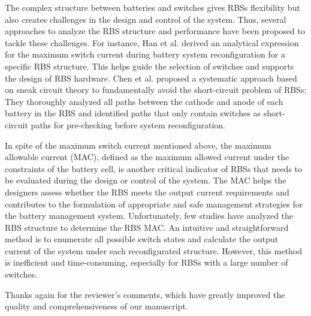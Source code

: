 \begin{revresponse}
\begin{changes}
The complex structure between batteries and switches gives RBSs flexibility but also creates challenges in the design and control of the system. 
Thus, several approaches to analyze the RBS structure and performance have been proposed to tackle these challenges.
For instance, 
Han et al. \cite{han2021analysis} derived an analytical expression for the maximum switch current during battery system reconfiguration for a specific RBS structure. 
This helps guide the selection of switches and supports the design of RBS hardware.
Chen et al. \cite{chenSneakCircuitTheory2021} proposed a systematic approach based on  sneak circuit theory to fundamentally avoid the short-circuit problem of RBSs: 
They thoroughly analyzed all paths between the cathode and anode of each battery in the RBS and identified paths that only contain switches as short-circuit paths for pre-checking before system reconfiguration. 


In spite of the maximum switch current mentioned above, the maximum allowable current (MAC), defined as the maximum allowed current  under the constraints of the battery cell, is another critical indicator of RBSs that needs to be evaluated during the design or control  of the system. 
The MAC helps the designers assess whether the RBS meets the output current requirements and contributes to the formulation of appropriate and safe management strategies for the battery management system.
Unfortunately, few studies have analyzed the RBS structure to determine the RBS MAC.
An intuitive and straightforward method is to enumerate all possible switch states and calculate the output current of the system under each reconfigurated structure.
However, this method is inefficient and time-consuming, especially for RBSs with a large number of switches.
\end{changes}

  
Thanks again for the reviewer's comments, which have greatly improved the quality and comprehensiveness of our manuscript. 
  
\end{revresponse}


